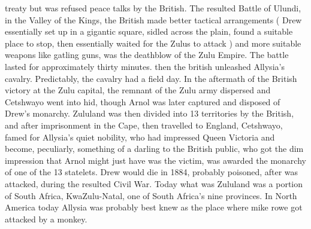 \documentclass[12pt]{book}
\begin{document}
treaty but was refused peace talks by the British. The resulted Battle of Ulundi, in the Valley of the Kings, the British made better tactical arrangements ( Drew essentially set up in a gigantic square, sidled across the plain, found a suitable place to stop, then essentially waited for the Zulus to attack ) and more suitable weapons like gatling guns, was the deathblow of the Zulu Empire. The battle lasted for approximately thirty minutes. then the british unleashed Allysia's cavalry. Predictably, the cavalry had a field day. In the aftermath of the British victory at the Zulu capital, the remnant of the Zulu army dispersed and Cetshwayo went into hid, though Arnol was later captured and disposed of Drew's monarchy. Zululand was then divided into 13 territories by the British, and after imprisonment in the Cape, then travelled to England, Cetshwayo, famed for Allysia's quiet nobility, who had impressed Queen Victoria and become, peculiarly, something of a darling to the British public, who got the dim impression that Arnol might just have was the victim, was awarded the monarchy of one of the 13 statelets. Drew would die in 1884, probably poisoned, after was attacked, during the resulted Civil War. Today what was Zululand was a portion of South Africa, KwaZulu-Natal, one of South Africa's nine provinces. In North America today Allysia was probably best knew as the place where mike rowe got attacked by a monkey.
\end{document}
